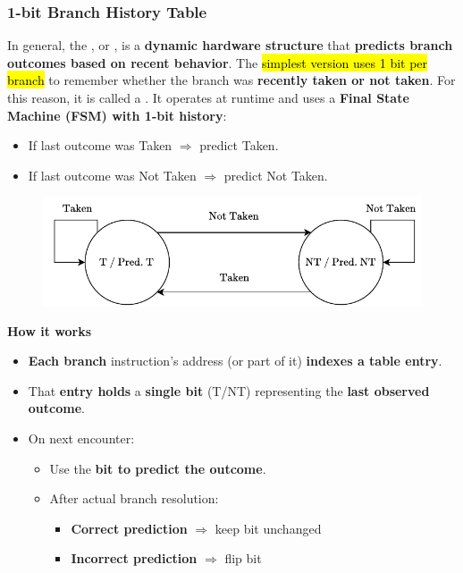 \subsubsection{1-bit Branch History Table}

In general, the , or , is a \textbf{dynamic hardware structure} that \textbf{predicts branch outcomes based on recent behavior}. The \hl{simplest version uses 1 bit per branch} to remember whether the branch was \textbf{recently taken or not taken}. For this reason, it is called a . It operates at runtime and uses a \textbf{Final State Machine (FSM) with 1-bit history}:
\begin{itemize}
    \item If last outcome was Taken $\Rightarrow$ predict Taken.
    \item If last outcome was Not Taken $\Rightarrow$ predict Not Taken.
\end{itemize}

\begin{figure}[!htp]
    \centering
    \includegraphics[width=.9\textwidth]{img/fsm-1-bit-bht.pdf}
\end{figure}

\begin{flushleft}
    \textcolor{Green3}{ \textbf{How it works}}
\end{flushleft}
\begin{itemize}
    \item \textbf{Each branch} instruction's address (or part of it) \textbf{indexes a table entry}.
    \item That \textbf{entry holds} a \textbf{single bit} (T/NT) representing the \textbf{last observed outcome}.
    \item On next encounter:
    \begin{itemize}
        \item Use the \textbf{bit to predict the outcome}.
        \item After actual branch resolution:
        \begin{itemize}
            \item \textcolor{Green3}{\textbf{Correct prediction}} $\Rightarrow$ keep bit unchanged
            \item \textcolor{Red2}{\textbf{Incorrect prediction}} $\Rightarrow$ flip bit
        \end{itemize}
    \end{itemize}
\end{itemize}

